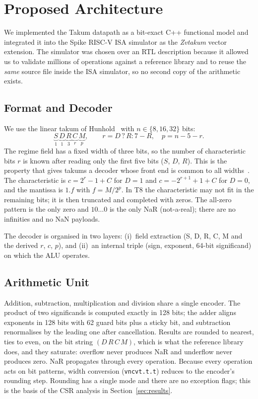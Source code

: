 \section{Proposed Architecture}
\label{sec:arch}

We implemented the Takum datapath as a bit-exact C++ functional model and integrated
it into the Spike RISC-V ISA simulator as the \emph{Zvtakum} vector extension. The
simulator was chosen over an RTL description because it allowed us to validate
millions of operations against a reference library and to reuse the \emph{same} source
file inside the ISA simulator, so no second copy of the arithmetic exists.

\subsection{Format and Decoder}
We use the linear takum of Hunhold~\cite{hunhold2024takum} with $n\in\{8,16,32\}$ bits:
\begin{equation}
\underbrace{S}_{1}\,\underbrace{D}_{1}\,\underbrace{R}_{3}\,\underbrace{C}_{r}\,\underbrace{M}_{p},
\qquad r = D\,?\,R : 7-R,\quad p = n-5-r .
\end{equation}
The regime field has a fixed width of three bits, so the number of characteristic
bits $r$ is known after reading only the first five bits ($S$, $D$, $R$). This is the
property that gives takums a decoder whose front end is common to all widths~\cite{hunhold2025avx}.
The characteristic is $c = 2^r-1+C$ for $D=1$ and $c=-2^{r+1}+1+C$ for $D=0$, and the
mantissa is $1.f$ with $f=M/2^p$. In T8 the characteristic may not fit in the
remaining bits; it is then truncated and completed with zeros. The all-zero pattern is the
only zero and $10\ldots0$ is the only NaR (not-a-real); there are no infinities and no NaN payloads.

The decoder is organised in two layers: (i)~field extraction (S, D, R, C, M and the derived $r$, $c$, $p$),
and (ii)~an internal triple (sign, exponent, 64-bit significand) on which the ALU operates.

\subsection{Arithmetic Unit}
Addition, subtraction, multiplication and division share a single encoder. The product of two
significands is computed exactly in 128 bits; the adder aligns exponents in 128 bits with
62 guard bits plus a sticky bit, and subtraction renormalises by the leading one after cancellation.
Results are rounded to nearest, ties to even, on the bit string $(D\,R\,C\,M)$, which
is what the reference library does, and they saturate: overflow never produces NaR and
underflow never produces zero. NaR propagates through every operation.
Because every operation acts on bit patterns, width conversion (\texttt{vncvt.t.t}) reduces to the
encoder's rounding step. Rounding has a single mode and there are no exception flags;
this is the basis of the CSR analysis in Section~\ref{sec:results}.

